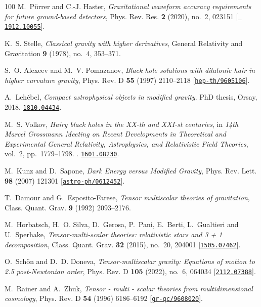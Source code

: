 \begin{thebibliography}{100}
M.~P\"urrer and C.-J. Haster,  {\em {Gravitational waveform accuracy
  requirements for future ground-based detectors}}, Phys. Rev. Res. {\bf 2}
  (2020), no.~2, 023151 [\href{http://www.arXiv.org/abs/1912.10055}{{\tt
  1912.10055}}].

K.~S. Stelle,  {\em Classical gravity with higher derivatives}, General
  Relativity and Gravitation {\bf 9} (1978), no.~4, 353--371.

S.~O. Alexeev and M.~V. Pomazanov,  {\em {Black hole solutions with dilatonic
  hair in higher curvature gravity}}, Phys. Rev. D {\bf 55} (1997) 2110--2118
  [\href{http://www.arXiv.org/abs/hep-th/9605106}{{\tt hep-th/9605106}}].

A.~Leh\'ebel, {\em {Compact astrophysical objects in modified gravity}}.
\newblock PhD thesis, Orsay, 2018.
\newblock \href{http://www.arXiv.org/abs/1810.04434}{{\tt 1810.04434}}.

M.~S. Volkov,  {\em {Hairy black holes in the XX-th and XXI-st centuries}}, in
  {\em {14th Marcel Grossmann Meeting on Recent Developments in Theoretical and
  Experimental General Relativity, Astrophysics, and Relativistic Field
  Theories}}, vol.~2, pp.~1779--1798.
.
\newblock \href{http://www.arXiv.org/abs/1601.08230}{{\tt 1601.08230}}.

M.~Kunz and D.~Sapone,  {\em {Dark Energy versus Modified Gravity}}, Phys. Rev.
  Lett. {\bf 98} (2007) 121301
  [\href{http://www.arXiv.org/abs/astro-ph/0612452}{{\tt astro-ph/0612452}}].

T.~Damour and G.~Esposito-Farese,  {\em {Tensor multiscalar theories of
  gravitation}}, Class. Quant. Grav. {\bf 9} (1992) 2093--2176.

M.~Horbatsch, H.~O. Silva, D.~Gerosa, P.~Pani, E.~Berti, L.~Gualtieri and
  U.~Sperhake,  {\em {Tensor-multi-scalar theories: relativistic stars and 3 +
  1 decomposition}}, Class. Quant. Grav. {\bf 32} (2015), no.~20, 204001
  [\href{http://www.arXiv.org/abs/1505.07462}{{\tt 1505.07462}}].

O.~Sch\"on and D.~D. Doneva,  {\em {Tensor-multiscalar gravity: Equations of
  motion to 2.5 post-Newtonian order}}, Phys. Rev. D {\bf 105} (2022), no.~6,
  064034 [\href{http://www.arXiv.org/abs/2112.07388}{{\tt 2112.07388}}].

M.~Rainer and A.~Zhuk,  {\em {Tensor - multi - scalar theories from
  multidimensional cosmology}}, Phys. Rev. D {\bf 54} (1996) 6186--6192
  [\href{http://www.arXiv.org/abs/gr-qc/9608020}{{\tt gr-qc/9608020}}].


\end{thebibliography}
